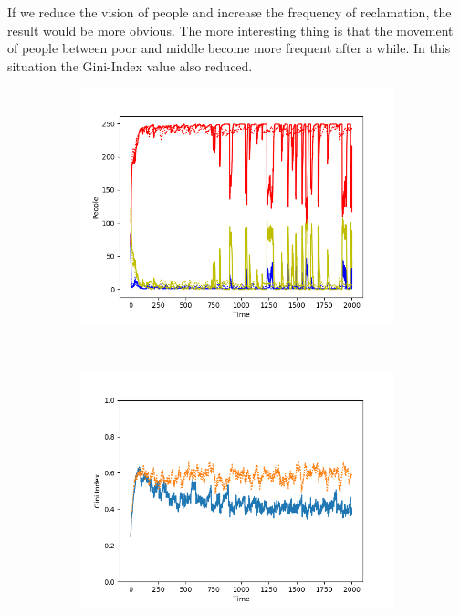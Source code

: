 If we reduce the vision of people and increase the frequency of reclamation, the result would be more obvious. The more interesting thing is that the movement of people between poor and middle become more frequent after a while. In this situation the Gini-Index value also reduced.
\begin{figure}[h]
	\centering
	\begin{subfigure}[t]{0.5\textwidth}
		\centering
		\includegraphics[scale=0.5]{final.png}
	\end{subfigure}%
	~ 
	\begin{subfigure}[t]{0.5\textwidth}
		\centering
		\includegraphics[scale=0.5]{gini_index.png}
	\end{subfigure}
\end{figure}


